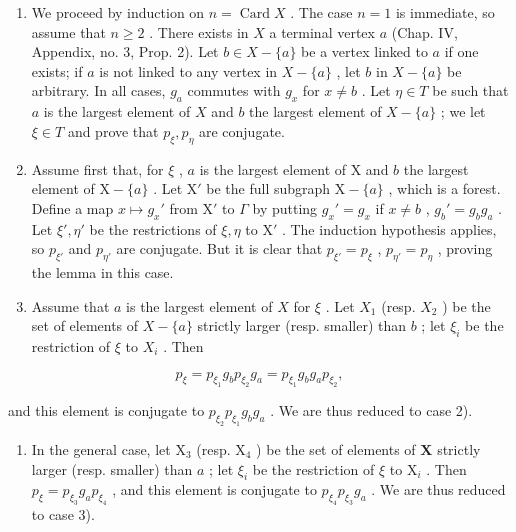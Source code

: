 \begin{enumerate}
\def\labelenumi{\arabic{enumi})}
\item
  We proceed by induction on \(n = \operatorname{Card} X\) . The case \(n = 1\) is immediate, so assume that \(n \geqslant 2\) . There exists in \(X\) a terminal vertex \(a\) (Chap. IV, Appendix, no. 3, Prop. 2). Let \(b \in X - \{a\}\) be a vertex linked to \(a\) if one exists; if \(a\) is not linked to any vertex in \(X - \{a\}\) , let \(b\) in \(X - \{a\}\) be arbitrary. In all cases, \(g_a\) commutes with \(g_x\) for \(x \neq b\) . Let \(\eta \in T\) be such that \(a\) is the largest element of \(X\) and \(b\) the largest element of \(X - \{a\}\) ; we let \(\xi \in T\) and prove that \(p_\xi, p_\eta\) are conjugate.
\item
  Assume first that, for \(\xi\) , \(a\) is the largest element of X and \(b\) the largest element of \(\mathrm{X} - \{a\}\) . Let \(\mathrm{X}'\) be the full subgraph \(\mathrm{X} - \{a\}\) , which is a forest. Define a map \(x \mapsto g_x'\) from \(\mathrm{X}'\) to \(\Gamma\) by putting \(g_x' = g_x\) if \(x \neq b\) , \(g_b' = g_b g_a\) . Let \(\xi', \eta'\) be the restrictions of \(\xi, \eta\) to \(\mathrm{X}'\) . The induction hypothesis applies, so \(p_{\xi'}\) and \(p_{\eta'}\) are conjugate. But it is clear that \(p_{\xi'} = p_{\xi}\) , \(p_{\eta'} = p_{\eta}\) , proving the lemma in this case.
\item
  Assume that \(a\) is the largest element of \(X\) for \(\xi\) . Let \(X_1\) (resp. \(X_2\) ) be the set of elements of \(X - \{a\}\) strictly larger (resp. smaller) than \(b\) ; let \(\xi_i\) be the restriction of \(\xi\) to \(X_i\) . Then
\end{enumerate}

\[
p _ {\xi} = p _ {\xi_ {1}} g _ {b} p _ {\xi_ {2}} g _ {a} = p _ {\xi_ {1}} g _ {b} g _ {a} p _ {\xi_ {2}},
\]

and this element is conjugate to \(p_{\xi_2}p_{\xi_1}g_b g_a\) . We are thus reduced to case 2).

\begin{enumerate}
\def\labelenumi{\arabic{enumi})}
\setcounter{enumi}{3}
\tightlist
\item
  In the general case, let \(\mathrm{X}_3\) (resp. \(\mathrm{X}_4\) ) be the set of elements of \(\mathbf{X}\) strictly larger (resp. smaller) than \(a\) ; let \(\xi_i\) be the restriction of \(\xi\) to \(\mathrm{X}_i\) . Then \(p_{\xi} = p_{\xi_3}g_a p_{\xi_4}\) , and this element is conjugate to \(p_{\xi_4}p_{\xi_3}g_a\) . We are thus reduced to case 3).
\end{enumerate}

